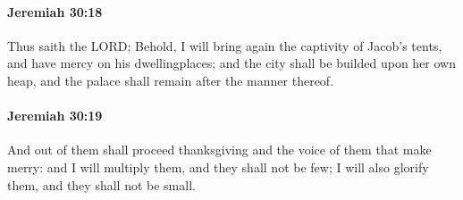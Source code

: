 		\paragraph{Jeremiah 30:18} %
			\label{JEREMIAH-30-18}

			Thus saith the LORD; Behold, I will bring again the captivity of Jacob’s tents, and have mercy on his dwellingplaces; and the city shall be builded upon her own heap, and the palace shall remain after the manner thereof.


		\paragraph{Jeremiah 30:19} %
			\label{JEREMIAH-30-19}

			And out of them shall proceed thanksgiving and the voice of them that make merry: and I will multiply them, and they shall not be few; I will also glorify them, and they shall not be small.

